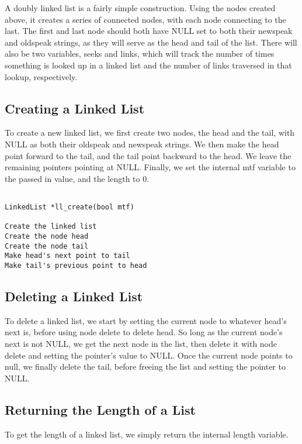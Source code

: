 \documentclass[11pt]{article}
\begin{document}
A doubly linked list is a fairly simple construction. Using the nodes created above, it creates a series of connected nodes, with each node connecting to the last. The first and last node should both have NULL set to both their newspeak and oldspeak strings, as they will serve as the head and tail of the list. There will also be two variables, seeks and links, which will track the number of times something is looked up in a linked list and the number of links traversed in that lookup, respectively.

\subsection{Creating a Linked List}

To create a new linked list, we first create two nodes, the head and the tail, with NULL as both their oldspeak and newspeak strings. We then make the head point forward to the tail, and the tail point backward to the head. We leave the remaining pointers pointing at NULL. Finally, we set the internal mtf variable to the passed in value, and the length to 0.

\begin{verbatim}

LinkedList *ll_create(bool mtf)

Create the linked list
Create the node head
Create the node tail
Make head's next point to tail
Make tail's previous point to head

\end{verbatim}

\subsection{Deleting a Linked List}

To delete a linked list, we start by setting the current node to whatever head's next is, before using node delete to delete head. So long as the current node's next is not NULL, we get the next node in the list, then delete it with node delete and setting the pointer's value to NULL. Once the current node points to null, we finally delete the tail, before freeing the list and setting the pointer to NULL.

\subsection{Returning the Length of a List}

To get the length of a linked list, we simply return the internal length variable.
\end{document}
